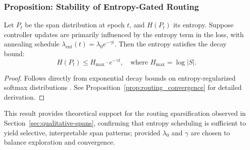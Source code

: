 \subsubsection*{Proposition: Stability of Entropy-Gated Routing}

\begin{proposition}
\label{prop:annealing}
Let \(P_t\) be the span distribution at epoch \(t\), and \(H(P_t)\) its entropy. Suppose controller updates are primarily influenced by the entropy term in the loss, with annealing schedule \(\lambda_{\mathrm{ent}}(t) = \lambda_0 e^{-\gamma t}\). Then the entropy satisfies the decay bound:
\begin{equation}
H(P_t) \leq H_{\max} \cdot e^{-\gamma t}, \quad \text{where } H_{\max} = \log |S|.
\label{eq:entropy_bound}
\end{equation}
\end{proposition}

\begin{proof}
Follows directly from exponential decay bounds on entropy-regularized softmax distributions \cite{grandvalet2006entropy}. See Proposition~\ref{prop:routing_convergence} for detailed derivation.
\end{proof}

This result provides theoretical support for the routing sparsification observed in Section~\ref{sec:qualitative-spans}, confirming that entropy scheduling is sufficient to yield selective, interpretable span patterns; provided \(\lambda_0\) and \(\gamma\) are chosen to balance exploration and convergence.
